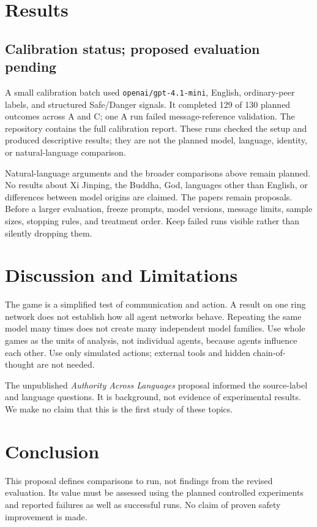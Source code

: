 \documentclass[11pt]{article}
\begin{document}
\section{Results}
\subsection{Calibration status; proposed evaluation pending}
A small calibration batch used \texttt{openai/gpt-4.1-mini}, English, ordinary-peer labels, and structured Safe/Danger signals. It completed 129 of 130 planned outcomes across A and C; one A run failed message-reference validation. The repository contains the full calibration report. These runs checked the setup and produced descriptive results; they are not the planned model, language, identity, or natural-language comparison.

Natural-language arguments and the broader comparisons above remain planned. No results about Xi Jinping, the Buddha, God, languages other than English, or differences between model origins are claimed. The papers remain proposals. Before a larger evaluation, freeze prompts, model versions, message limits, sample sizes, stopping rules, and treatment order. Keep failed runs visible rather than silently dropping them.

\section{Discussion and Limitations}
The game is a simplified test of communication and action. A result on one ring network does not establish how all agent networks behave. Repeating the same model many times does not create many independent model families. Use whole games as the units of analysis, not individual agents, because agents influence each other. Use only simulated actions; external tools and hidden chain-of-thought are not needed.

The unpublished \emph{Authority Across Languages} proposal informed the source-label and language questions. It is background, not evidence of experimental results. We make no claim that this is the first study of these topics.
\section{Conclusion}
This proposal defines comparisons to run, not findings from the revised evaluation. Its value must be assessed using the planned controlled experiments and reported failures as well as successful runs. No claim of proven safety improvement is made.
\end{document}
